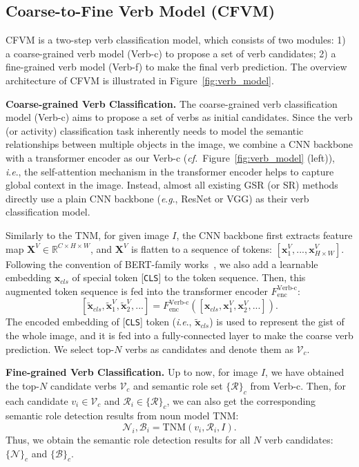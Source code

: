 \documentclass[letterpaper]{article} \usepackage{aaai22}  \usepackage{times}  \usepackage{helvet}  \usepackage{courier}  \usepackage[hyphens]{url}  \usepackage{graphicx} \urlstyle{rm} \def\UrlFont{\rm}  \usepackage{natbib}  \usepackage{caption} \DeclareCaptionStyle{ruled}{labelfont=normalfont,labelsep=colon,strut=off} \frenchspacing  \setlength{\pdfpagewidth}{8.5in}  \setlength{\pdfpageheight}{11in}
\newcommand{\ie}{\textit{i}.\textit{e}.}
\newcommand{\eg}{\textit{e}.\textit{g}.}
\newcommand{\cf}{\textit{cf.}}
\begin{document}
 
\subsection{Coarse-to-Fine Verb Model (CFVM)}

CFVM is a two-step verb classification model, which consists of two modules: 1) a coarse-grained verb model (Verb-c) to propose a set of verb candidates; 2) a fine-grained verb model (Verb-f) to make the final verb prediction. The overview architecture of CFVM is illustrated in Figure~\ref{fig:verb_model}.


\noindent\textbf{Coarse-grained Verb Classification.}
The coarse-grained verb classification model (Verb-c) aims to propose a set of verbs as initial candidates. Since the verb (or activity) classification task inherently needs to model the semantic relationships between multiple objects in the image, we combine a CNN backbone with a transformer encoder as our Verb-c (\cf~Figure~\ref{fig:verb_model} (left)), \ie, the self-attention mechanism in the transformer encoder helps to capture global context in the image. Instead, almost all existing GSR (or SR) methods directly use a plain CNN backbone (\eg, ResNet or VGG) as their verb classification model.



Similarly to the TNM, for given image $I$, the CNN backbone first extracts feature map $\bm{X}^V \in \mathbb{R}^{C\times H\times W}$, and $\bm{X}^V$ is flatten to a sequence of tokens: $[\bm{x}^V_1, ..., \bm{x}^V_{H\times W}]$. Following the convention of BERT-family works~\cite{devlin2018bert}, we also add a learnable embedding $\bm{x}_{cls}$ of special token [\texttt{CLS}] to the token sequence. Then, this augmented token sequence is fed into the transformer encoder $F^{\text{Verb-c}}_{\text{enc}}$:
\begin{equation} \label{equ:6}
    \left[ \tilde{\bm{x}}_{cls}, \tilde{\bm{x}}^V_1, \tilde{\bm{x}}^V_2, ... \right] = F^{\text{Verb-c}}_{\text{enc}} (\left[\bm{x}_{cls}, \bm{x}^V_1, \bm{x}^V_2, ... \right]).
\end{equation}
The encoded embedding of [\texttt{CLS}] token (\ie, $\tilde{\bm{x}}_{cls}$) is used to represent the gist of the whole image, and it is fed into a fully-connected layer to make the coarse verb prediction. We select top-$N$ verbs as candidates and denote them as $\mathcal{V}_c$.








\noindent\textbf{Fine-grained Verb Classification.} Up to now, for image $I$, we have obtained the top-$N$ candidate verbs $\mathcal{V}_c$ and semantic role set $\{\mathcal{R}\}_c$ from Verb-c. Then, for each candidate $v_i \in \mathcal{V}_c$ and $\mathcal{R}_i \in \{\mathcal{R}\}_c$, we can also get the corresponding semantic role detection results from noun model TNM:
\begin{equation}
    \mathcal{N}_i, \mathcal{B}_i = \text{TNM} (v_i, \mathcal{R}_i, I).
\end{equation}
Thus, we obtain the semantic role detection results for all $N$ verb candidates: $\{\mathcal{N}\}_c$ and $\{\mathcal{B}\}_c$.
\end{document}
